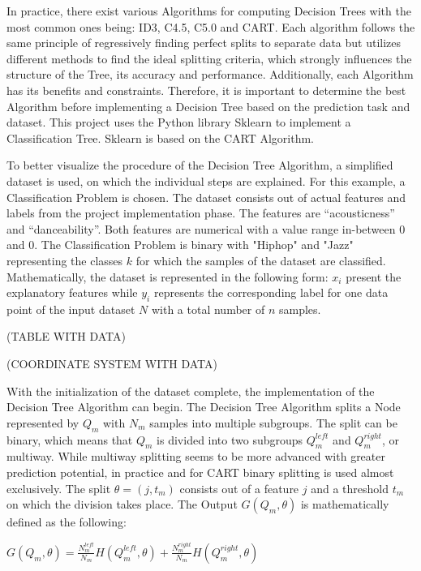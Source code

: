 In practice, there exist various Algorithms for computing Decision Trees with the most common ones 
being: ID3, C4.5, C5.0 and CART. Each algorithm follows the same principle of regressively finding 
perfect splits to separate data but utilizes different methods to find the ideal splitting 
criteria, which strongly influences the structure of the Tree, its accuracy and performance. 
Additionally, each Algorithm has its benefits and constraints. Therefore, it is important to 
determine the best Algorithm before implementing a Decision Tree based on the prediction task 
and dataset. This project uses the Python library Sklearn to implement a Classification Tree. 
Sklearn is based on the CART Algorithm.

To better visualize the procedure of the Decision Tree Algorithm, a simplified dataset is used, 
on which the individual steps are explained. For this example, a Classification Problem is chosen. 
The dataset consists out of actual features and labels from the project implementation phase. The 
features are “acousticness” and “danceability”. Both features are numerical with a value range 
in-between \(0\) and \(0\). The Classification Problem is binary with "Hiphop" and "Jazz" representing 
the classes \(k\) for which the samples of the dataset are classified. Mathematically, the dataset 
is represented in the following form: \(x_{i}\) present the explanatory features while \(y_{i}\) represents 
the corresponding label for one data point of the input dataset \(N\) with a total number of \(n\) 
samples.

(TABLE WITH DATA)

(COORDINATE SYSTEM WITH DATA)

With the initialization of the dataset complete, the implementation of the Decision Tree 
Algorithm can begin. The Decision Tree Algorithm splits a Node represented by \(Q_{m}\) with \(N_{m}\) samples 
into multiple subgroups. The split can be binary, which means that \(Q_{m}\) is divided into two 
subgroups \(Q^{left}_{m}\) and \(Q^{right}_{m}\), or multiway. While multiway splitting seems to be more advanced 
with greater prediction potential, in practice and for CART binary splitting is used almost 
exclusively. The split \(\theta = (j, t_{m})\) consists out of a feature \(j\) and a threshold \(t_{m}\) on which the 
division takes place. The Output \(G(Q_{m},\theta)\) is mathematically defined as the following: 

\(G(Q_{m},\theta) = \frac{N^{left}_{m}}{N_{m}} H(Q^{left}_{m}, \theta ) + \frac{N^{right}_{m}}{N_{m}} H(Q^{right}_{m}, \theta ) \)

